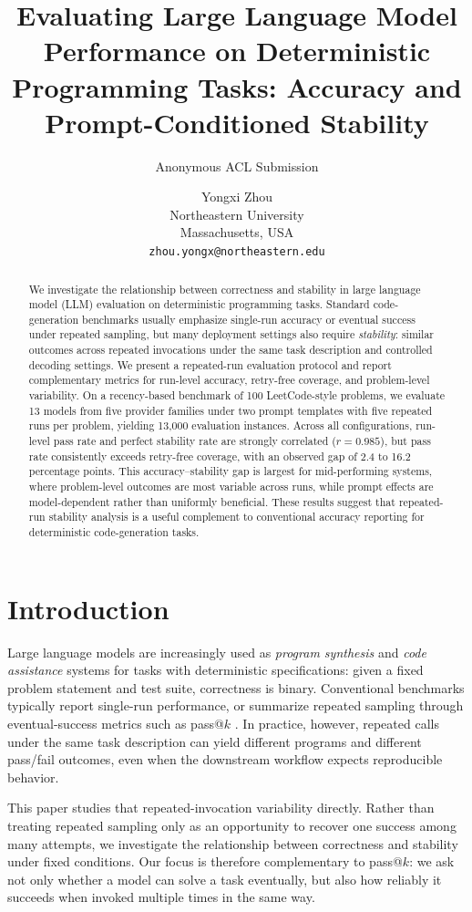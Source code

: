 \documentclass[11pt]{article}
\title{Evaluating Large Language Model Performance on Deterministic Programming Tasks: Accuracy and Prompt-Conditioned Stability}
\author{Anonymous ACL Submission}
\author{
  Yongxi Zhou \\
  Northeastern University \\
  Massachusetts, USA \\
  \texttt{zhou.yongx@northeastern.edu}
}
\begin{document}
\maketitle

\begin{abstract}
We investigate the relationship between correctness and stability in large language model (LLM) evaluation on deterministic programming tasks. Standard code-generation benchmarks usually emphasize single-run accuracy or eventual success under repeated sampling, but many deployment settings also require \emph{stability}: similar outcomes across repeated invocations under the same task description and controlled decoding settings. We present a repeated-run evaluation protocol and report complementary metrics for run-level accuracy, retry-free coverage, and problem-level variability. On a recency-based benchmark of 100 LeetCode-style problems, we evaluate 13 models from five provider families under two prompt templates with five repeated runs per problem, yielding 13{,}000 evaluation instances. Across all configurations, run-level pass rate and perfect stability rate are strongly correlated ($r=0.985$), but pass rate consistently exceeds retry-free coverage, with an observed gap of 2.4 to 16.2 percentage points. This accuracy--stability gap is largest for mid-performing systems, where problem-level outcomes are most variable across runs, while prompt effects are model-dependent rather than uniformly beneficial. These results suggest that repeated-run stability analysis is a useful complement to conventional accuracy reporting for deterministic code-generation tasks.
\end{abstract}

\section{Introduction}
Large language models are increasingly used as \emph{program synthesis} and \emph{code assistance} systems for tasks with deterministic specifications: given a fixed problem statement and test suite, correctness is binary. Conventional benchmarks typically report single-run performance, or summarize repeated sampling through eventual-success metrics such as pass@$k$ \cite{chen2021codex,austin2021program}. In practice, however, repeated calls under the same task description can yield different programs and different pass/fail outcomes, even when the downstream workflow expects reproducible behavior.

This paper studies that repeated-invocation variability directly. Rather than treating repeated sampling only as an opportunity to recover one success among many attempts, we investigate the relationship between correctness and stability under fixed conditions. Our focus is therefore complementary to pass@$k$: we ask not only whether a model can solve a task eventually, but also how reliably it succeeds when invoked multiple times in the same way.
\end{document}
